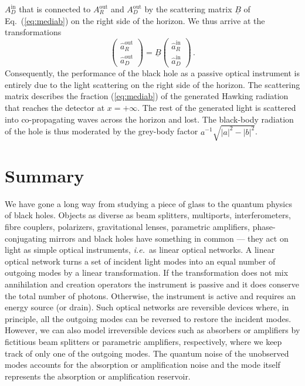 \documentclass[12pt,amsmath,amssymb]{article}
\numberwithin{equation}{section}
\begin{document}
$A_D^\mathrm{in}$
that is connected to $A_R^\mathrm{out}$ and $A_D^\mathrm{out}$
by the scattering matrix $\underline{B}$
of Eq.\ (\ref{eq:mediab}) on the right side of the horizon.
We thus arrive at the transformations
\begin{equation}
\left(
    \begin{array}{c}
     \hat{a}_R^\mathrm{out}  \\
     \hat{a}_D^\mathrm{out}
    \end{array}
\right)
=
\underline{B}
\left(
    \begin{array}{c}
     \hat{a}_R^\mathrm{in}  \\
     \hat{a}_D^\mathrm{in}
    \end{array}
\right)\,.
\end{equation}
Consequently, the
performance of the black hole as a
passive optical instrument is entirely due to
the light scattering on the right side of the horizon.
The scattering matrix describes the fraction
(\ref{eq:mediab}) of the generated
Hawking radiation that reaches the detector at $x=+\infty$.
The rest of the generated light is scattered into
co-propagating waves across the horizon and lost.
The black-body radiation of the hole is thus moderated
by the grey-body factor $a^{-1}\sqrt{|a|^2-|b|^2}$.

\section{Summary}

We have gone a long way from studying a piece of glass to the quantum
physics of black holes. Objects as diverse as beam splitters,
multiports, interferometers, fibre couplers, polarizers, gravitational lenses,
parametric amplifiers, phase-conjugating mirrors and
black holes have something in common ---
they act on light as simple optical instruments, {\it i.e.}\
as linear optical networks.
A linear optical network turns a set of incident light
modes into an equal number of outgoing modes by a linear
transformation. If the transformation does not mix annihilation
and creation operators the instrument is passive and it does conserve
the total number of photons. Otherwise, the instrument is active
and requires an energy source (or drain).
Such optical networks are reversible devices where, in principle,
all the outgoing modes can be reversed to restore the incident modes.
However, we can also model irreversible devices such as
absorbers or amplifiers by fictitious beam splitters or
parametric amplifiers, respectively, where we keep track
of only one of the outgoing modes. The quantum noise of
the unobserved modes accounts for the absorption or amplification
noise and the mode itself represents the absorption or
amplification reservoir.
\end{document}
